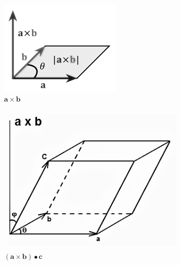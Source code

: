 \documentclass{amsart}
\begin{document}
		\begin{figure}
			\centering
			\begin{subfigure}{.45\linewidth}
				\includegraphics[width=\linewidth]{Fall_2017_Math_Research_Paper_Visuals/Cross_Product_Internet}
				\caption{$\mathbf{a} \times \mathbf{b}$}
				\label{crosspic}
			\end{subfigure}
			\begin{subfigure}{.45\linewidth}
				\includegraphics[width=.9\linewidth]{Fall_2017_Math_Research_Paper_Visuals/Triple_Scalar_Product_Internet_Visual}
				\caption{$(\mathbf{a} \times \mathbf{b}) \bullet \mathbf{c}$}
				\label{triplescalarproduct}
			\end{subfigure}
			\caption{}
			\label{cross}
		\end{figure}
				
\end{document}
